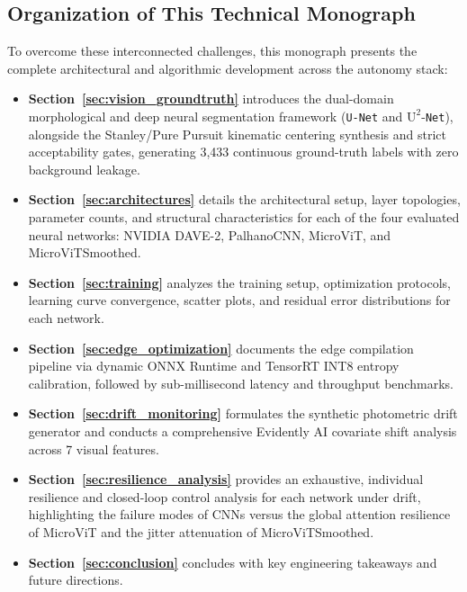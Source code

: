 \documentclass[10pt,journal,compsoc]{IEEEtran}
\begin{document}
\subsection{Organization of This Technical Monograph}
To overcome these interconnected challenges, this monograph presents the complete architectural and algorithmic development across the autonomy stack:
\begin{itemize}
    \item \textbf{Section~\ref{sec:vision_groundtruth}} introduces the dual-domain morphological and deep neural segmentation framework (\texttt{U-Net} and $\text{U}^2$-\texttt{Net}), alongside the Stanley/Pure Pursuit kinematic centering synthesis and strict acceptability gates, generating 3,433 continuous ground-truth labels with zero background leakage.
    \item \textbf{Section~\ref{sec:architectures}} details the architectural setup, layer topologies, parameter counts, and structural characteristics for each of the four evaluated neural networks: NVIDIA DAVE-2, PalhanoCNN, MicroViT, and MicroViTSmoothed.
    \item \textbf{Section~\ref{sec:training}} analyzes the training setup, optimization protocols, learning curve convergence, scatter plots, and residual error distributions for each network.
    \item \textbf{Section~\ref{sec:edge_optimization}} documents the edge compilation pipeline via dynamic ONNX Runtime and TensorRT INT8 entropy calibration, followed by sub-millisecond latency and throughput benchmarks.
    \item \textbf{Section~\ref{sec:drift_monitoring}} formulates the synthetic photometric drift generator and conducts a comprehensive Evidently AI covariate shift analysis across 7 visual features.
    \item \textbf{Section~\ref{sec:resilience_analysis}} provides an exhaustive, individual resilience and closed-loop control analysis for each network under drift, highlighting the failure modes of CNNs versus the global attention resilience of MicroViT and the jitter attenuation of MicroViTSmoothed.
    \item \textbf{Section~\ref{sec:conclusion}} concludes with key engineering takeaways and future directions.
\end{itemize}

\end{document}
